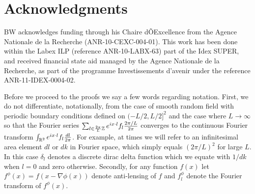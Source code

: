 \documentclass[iop,revtex4,apj,onecolumn]{emulateapj}
\begin{document}
%
%

\section*{Acknowledgments}
BW acknowledges funding through his Chaire dÕExcellence from the Agence Nationale
de la Recherche (ANR-10-CEXC-004-01). This work has been done within the Labex ILP (reference ANR-10-LABX-63) part of the Idex SUPER, and received financial state aid managed by the Agence Nationale de la Recherche, as part of the programme Investissements d'avenir under the reference ANR-11-IDEX-0004-02.




%
%
\appendix


Before we proceed to the proofs we say a few words regarding notation.
First, we do not differentiate, notationally, from the case of smooth random field with periodic boundary conditions defined on $(-L/2, L/2]^2$ and the case where $L\rightarrow \infty$ so that the Fourier series $\sum_{l \in \frac{2\pi}{L}\Bbb Z }   e^{i x\cdot l}  f_l \frac{2\pi/ L}{2\pi} $ converges to the continuous Fourier transform $\int_{\Bbb R^2}  e^{i x\cdot l}  f_l \frac{dl}{2\pi} $. %
For example, at times we will refer to an infinitesimal area element $dl$ or $dk$ in Fourier space, which simply equals $(2\pi / L)^2$ for large $L$. In this case $\delta_l$ denotes a discrete dirac delta function which we equate with $1/dk$ when $l=0$ and zero otherwise. 
Secondly, for any function $f(x)$ let $f^\phi(x) = f(x-\nabla \phi(x))$ denote anti-lensing of $f$ and $f^\phi_l$ denote the Fourier transform of  $f^\phi(x)$.
\end{document}
